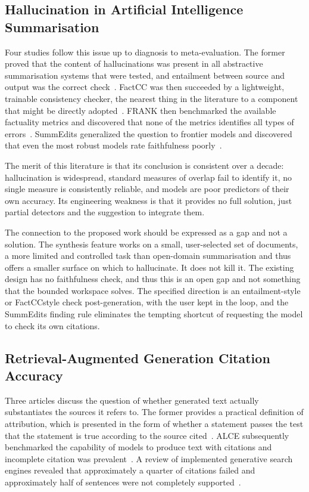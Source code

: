 \documentclass{FastFyp}
\begin{document}
\subsection{Hallucination in Artificial Intelligence Summarisation}
Four studies follow this issue up to diagnosis to meta-evaluation. The former proved that the content of hallucinations was present in all abstractive summarisation systems that were tested, and entailment between source and output was the correct check~\cite{ref:maynez2020}. FactCC was then succeeded by a lightweight, trainable consistency checker, the nearest thing in the literature to a component that might be directly adopted~\cite{ref:kryscinski2020}. FRANK then benchmarked the available factuality metrics and discovered that none of the metrics identifies all types of errors~\cite{ref:pagnoni2021}. SummEdits generalized the question to frontier models and discovered that even the most robust models rate faithfulness poorly~\cite{ref:laban2023}.

The merit of this literature is that its conclusion is consistent over a decade: hallucination is widespread, standard measures of overlap fail to identify it, no single measure is consistently reliable, and models are poor predictors of their own accuracy. Its engineering weakness is that it provides no full solution, just partial detectors and the suggestion to integrate them.

The connection to the proposed work should be expressed as a gap and not a solution. The synthesis feature works on a small, user-selected set of documents, a more limited and controlled task than open-domain summarisation and thus offers a smaller surface on which to hallucinate. It does not kill it. The existing design has no faithfulness check, and thus this is an open gap and not something that the bounded workspace solves. The specified direction is an entailment-style or FactCCstyle check post-generation, with the user kept in the loop, and the SummEdits finding rule eliminates the tempting shortcut of requesting the model to check its own citations.

\subsection{Retrieval-Augmented Generation Citation Accuracy}
Three articles discuss the question of whether generated text actually substantiates the sources it refers to. The former provides a practical definition of attribution, which is presented in the form of whether a statement passes the test that the statement is true according to the source cited~\cite{ref:rashkin2023}. ALCE subsequently benchmarked the capability of models to produce text with citations and incomplete citation was prevalent~\cite{ref:gao2023}. A review of implemented generative search engines revealed that approximately a quarter of citations failed and approximately half of sentences were not completely supported~\cite{ref:liu2023}.
\end{document}
